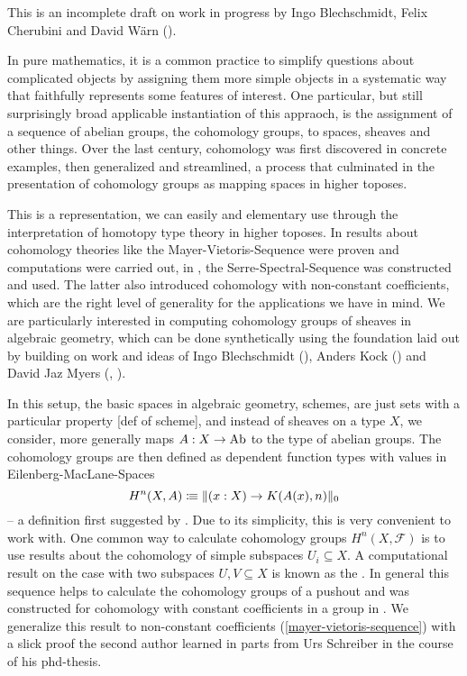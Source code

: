 This is an incomplete draft on work in progress by Ingo Blechschmidt, Felix Cherubini and David Wärn (\cite{chech-draft}).

In pure mathematics,
it is a common practice to simplify questions about complicated objects
by assigning them more simple objects in a systematic way that faithfully represents some features of interest.
One particular, but still surprisingly broad applicable instantiation of this appraoch,
is the assignment of a sequence of abelian groups, the cohomology groups, to spaces, sheaves and other things.
Over the last century, cohomology was first discovered in concrete examples, then generalized and streamlined,
a process that culminated in the presentation of cohomology groups as mapping spaces in higher toposes.

This is a representation, we can easily and elementary use through the interpretation of homotopy type theory in higher toposes.
In \cite{evan-master-thesis} results about cohomology theories like the Mayer-Vietoris-Sequence were proven and computations were carried out,
in \cite{floris-thesis}, the Serre-Spectral-Sequence was constructed and used.
The latter also introduced cohomology with non-constant coefficients,
which are the right level of generality for the applications we have in mind.
We are particularly interested in computing cohomology groups of sheaves in algebraic geometry,
which can be done synthetically using the foundation laid out by \cite{draft}
building on work and ideas of Ingo Blechschmidt (\cite{ingo-thesis}), Anders Kock (\cite{kock-sdg})
and David Jaz Myers (\cite{myers-talk1}, \cite{myers-talk2}).

In this setup, the basic spaces in algebraic geometry, schemes, are just sets with a particular property \cite{draft}[def of scheme],
and instead of sheaves on a type $X$, we consider, more generally maps $A:X\to\operatorname{Ab}$ to the type of abelian groups.
The cohomology groups are then defined as dependent function types with values in Eilenberg-MacLane-Spaces
\[ H^n(X,A)\vcentcolon\mspace{-1.2mu}\equiv \|(x:X)\to K(A(x),n)\|_0\]
-- a definition first suggested by \cite{mike-blogpost}.
Due to its simplicity, this is very convenient to work with.
One common way to calculate cohomology groups $H^n(X,\mathcal F)$ is to
use results about the cohomology of simple subspaces $U_i\subseteq X$.
A computational result on the case with two subspaces $U,V\subseteq X$ is known as the .
In general this sequence helps to calculate the cohomology groups of a pushout
and was constructed for cohomology with constant coefficients in a group in \cite{evan-master-thesis}.
We generalize this result to non-constant coefficients (\cref{mayer-vietoris-sequence})
with a slick proof the second author learned in parts from Urs Schreiber in the course of his phd-thesis.

